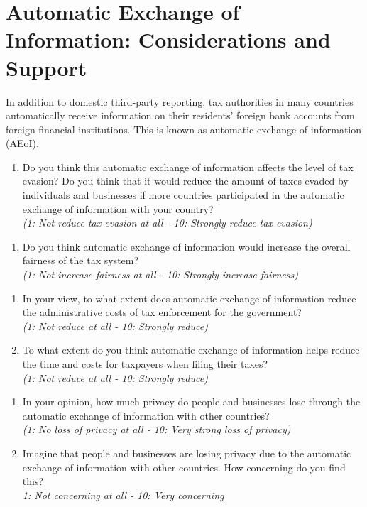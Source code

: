 \documentclass[11pt]{article}
\begin{document}
\section*{Automatic Exchange of Information: Considerations and Support}
In addition to domestic third-party reporting, tax authorities in many countries automatically receive information on their residents’ foreign bank accounts from foreign financial institutions. This is known as automatic exchange of information (AEoI). 

\begin{enumerate}[resume]
    \item Do you think this automatic exchange of information affects the level of tax evasion? Do you think that it would reduce the amount of taxes evaded by individuals and businesses if more countries participated in the automatic exchange of information with your country?\\
    \textit{(1: Not reduce tax evasion at all - 10: Strongly reduce tax evasion)} 
\end{enumerate}
\begin{enumerate}[resume]
    \item Do you think automatic exchange of information would increase the overall fairness of the tax system? \\
    \textit{(1: Not increase fairness at all - 10: Strongly increase fairness)} 
\end{enumerate}
\begin{enumerate}[resume]
    \item In your view, to what extent does automatic exchange of information reduce the administrative costs of tax enforcement for the government?\\
\textit{(1: Not reduce at all - 10: Strongly reduce)}

\item To what extent do you think automatic exchange of information helps reduce the time and costs for taxpayers when filing their taxes?\\
\textit{(1: Not reduce at all - 10: Strongly reduce)}
\end{enumerate}
\begin{enumerate}[resume]
    \item In your opinion, how much privacy do people and businesses lose through the automatic exchange of information  with other countries? \\
    \textit{(1: No loss of privacy at all - 10: Very strong loss of privacy)} 
    \item Imagine that people and businesses are losing privacy due to the automatic exchange of information  with other countries. How concerning do you find this? \\ 
    \textit{1: Not concerning at all - 10: Very concerning}
\end{enumerate}
\end{document}
